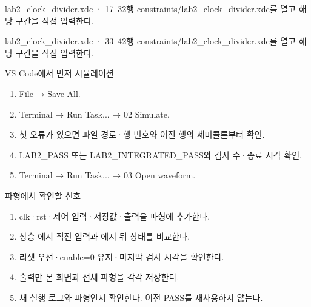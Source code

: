\begin{frame}{lab2\_clock\_divider.xdc · 17–32행}
\small
constraints/lab2\_clock\_divider.xdc를 열고 해당 구간을 직접 입력한다.\par\vspace{0.4cm}\par\vspace{0.4cm}
\end{frame}

\begin{frame}{lab2\_clock\_divider.xdc · 33–42행}
\small
constraints/lab2\_clock\_divider.xdc를 열고 해당 구간을 직접 입력한다.\par\vspace{0.4cm}\par\vspace{0.4cm}
\end{frame}

\begin{frame}[label=simulation]{VS Code에서 먼저 시뮬레이션}
\small
\begin{enumerate}
\item File → Save All.
\item Terminal → Run Task... → 02 Simulate.
\item 첫 오류가 있으면 파일 경로·행 번호와 이전 행의 세미콜론부터 확인.
\item LAB2\_PASS 또는 LAB2\_INTEGRATED\_PASS와 검사 수·종료 시각 확인.
\item Terminal → Run Task... → 03 Open waveform.
\end{enumerate}
\end{frame}

\begin{frame}{파형에서 확인할 신호}
\small
\begin{enumerate}
\item clk·rst·제어 입력·저장값·출력을 파형에 추가한다.
\item 상승 에지 직전 입력과 에지 뒤 상태를 비교한다.
\item 리셋 우선·enable=0 유지·마지막 검사 시각을 확인한다.
\item 출력만 본 화면과 전체 파형을 각각 저장한다.
\item 새 실행 로그와 파형인지 확인한다. 이전 PASS를 재사용하지 않는다.
\end{enumerate}
\end{frame}

